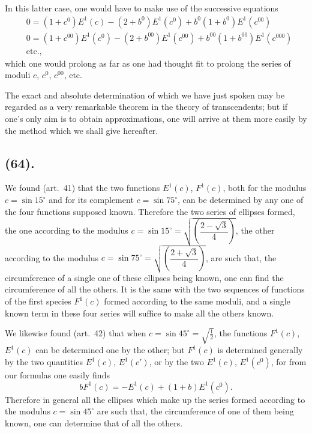 \documentclass{article}
\begin{document}

In this latter case, one would have to make use of the successive equations
\[ \begin{aligned} &0=(1+c^{0})E^{1}(c)-(2+b^{0})E^{1}(c^{0})+b^{0}(1+b^{0})E^{1}(c^{00})\\ &0=(1+c^{00})E^{1}(c^{0})-(2+b^{00})E^{1}(c^{00})+b^{00}(1+b^{00})E^{1}(c^{000})\\ &\text{etc.}, \end{aligned} \]
which one would prolong as far as one had thought fit to prolong the series of moduli $c$, $c^{0}$, $c^{00}$, etc.

The exact and absolute determination of which we have just spoken may be regarded as a very remarkable theorem in the theory of transcendents; but if one's only aim is to obtain approximations, one will arrive at them more easily by the method which we shall give hereafter.

\subsection*{(64).}

We found (art.~41) that the two functions $E^{1}(c)$, $F^{1}(c)$, both for the modulus $c=\sin15^{\circ}$ and for its complement $c=\sin75^{\circ}$, can be determined by any one of the four functions supposed known. Therefore the two series of ellipses formed, the one according to the modulus $c=\sin15^{\circ}=\sqrt{\left(\dfrac{2-\sqrt{3}}{4}\right)}$, the other according to the modulus $c=\sin75^{\circ}=\sqrt{\left(\dfrac{2+\sqrt{3}}{4}\right)}$, are such that, the circumference of a single one of these ellipses being known, one can find the circumference of all the others. It is the same with the two sequences of functions of the first species $F^{1}(c)$ formed according to the same moduli, and a single known term in these four series will suffice to make all the others known.

We likewise found (art.~42) that when $c=\sin45^{\circ}=\sqrt{\tfrac{1}{2}}$, the functions $F^{1}(c)$, $E^{1}(c)$ can be determined one by the other; but $F^{1}(c)$ is determined generally by the two quantities $E^{1}(c)$, $E^{1}(c')$, or by the two $E^{1}(c)$, $E^{1}(c^{0})$, for from our formulas one easily finds
\[ bF^{1}(c)=-E^{1}(c)+(1+b)E^{1}(c^{0}). \]
Therefore in general all the ellipses which make up the series formed according to the modulus $c=\sin45^{\circ}$ are such that, the circumference of one of them being known, one can determine that of all the others.
\end{document}
